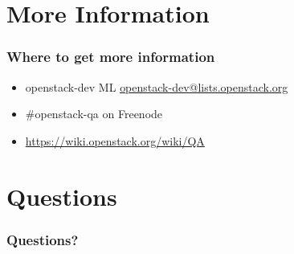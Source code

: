 \documentclass[aspectratio=169,11pt,hyperref={colorlinks=true}]{beamer}
\begin{document}
\section{More Information}
\begin{frame}
\frametitle{Where to get more information}
    \begin{itemize}
        \item openstack-dev ML\: \href{mailto:openstack-dev@lists.openstack.org}{openstack-dev@lists.openstack.org}
        \item \#openstack-qa on Freenode
        \item \href{https://wiki.openstack.org/wiki/QA}{https://wiki.openstack.org/wiki/QA}
    \end{itemize}
\end{frame}

\section{Questions}
\begin{frame}
\frametitle{Questions?}
\end{frame}
\end{document}
